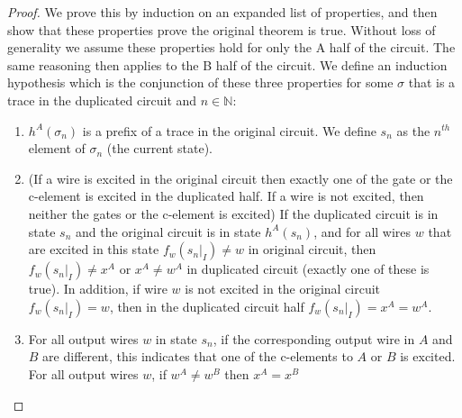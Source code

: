 \documentclass{article}
\begin{document}
\begin{proof}
We prove this by induction on an expanded list of properties, and then show that these properties prove the original theorem is true.  Without loss of generality we assume these properties hold for only the A half of the circuit.  The same reasoning then applies to the B half of the circuit.  We define an induction hypothesis which is the conjunction of these three properties for some $\sigma$ that is a trace in the duplicated circuit and $n \in \mathbb{N}$:  
\begin{enumerate} %
\item   $h^A(\sigma_n)$ is a prefix of a trace in the original circuit.  We define $s_n$ as the $n^{th}$ element of $\sigma_n$ (the current state). %
\item  (If a wire is excited in the original circuit then exactly one of the gate or the c-element is excited in the duplicated half.  If a wire is not excited, then neither the gates or the c-element is excited) If the duplicated circuit is in state $s_n$ and the original circuit is in state $h^A(s_n)$, and for all wires $w$ that are excited in this state $f_w(s_n|_I)\neq w$ in original circuit, then $f_w(s_n|_I) \neq x^A$ or $x^A \neq w^A$ in duplicated circuit (exactly one of these is true).  
In addition, if wire $w$ is not excited in the original circuit $f_w(s_n|_I)=w$, then in the duplicated circuit half $f_w(s_n|_I)=x^A=w^A$.  %
\item  For all output wires $w$ in state $s_n$, if the corresponding output wire in $A$ and $B$ are different, this indicates that one of the c-elements to $A$ or $B$ is excited.  For all output wires $w$, if $w^A\neq w^B$ then $x^A=x^B$ 
\end{enumerate}


\end{proof}
\end{document}
